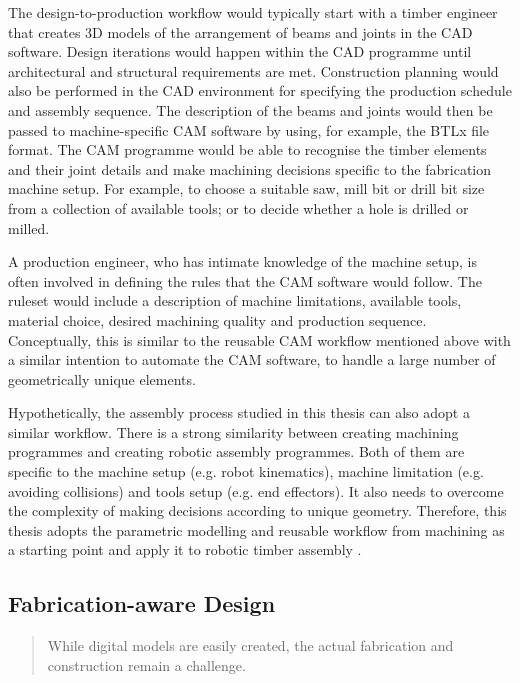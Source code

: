 The design-to-production workflow would typically start with a timber engineer that creates 3D models of the arrangement of beams and joints in the CAD software. Design iterations would happen within the CAD programme until architectural and structural requirements are met. Construction planning would also be performed in the CAD environment for specifying the production schedule and assembly sequence. The description of the beams and joints would then be passed to machine-specific CAM software by using, for example, the BTLx file format. The CAM programme would be able to recognise the timber elements and their joint details and make machining decisions specific to the fabrication machine setup. For example, to choose a suitable saw, mill bit or drill bit size from a collection of available tools; or to decide whether a hole is drilled or milled.

A production engineer, who has intimate knowledge of the machine setup, is often involved in defining the rules that the CAM software would follow. The ruleset would include a description of machine limitations, available tools, material choice, desired machining quality and production sequence. Conceptually, this is similar to the reusable CAM workflow mentioned above with a similar intention to automate the CAM software, to handle a large number of geometrically unique elements. 

Hypothetically, the assembly process studied in this thesis can also adopt a similar workflow. There is a strong similarity between creating machining programmes and creating robotic assembly programmes. Both of them are specific to the machine setup (e.g. robot kinematics), machine limitation (e.g. avoiding collisions) and tools setup (e.g. end effectors). It also needs to overcome the complexity of making decisions according to unique geometry. Therefore, this thesis adopts the parametric modelling and reusable workflow from machining as a starting point and apply it to robotic timber assembly . 

\subsection{Fabrication-aware Design}
\label{subsection:introduction_fabrication_aware_design}

\begin{quote}
	While digital models are easily created, the actual fabrication and construction remain a challenge. \parencite{pottmannArchitecturalGeometryFabricationAware2013}
\end{quote}


